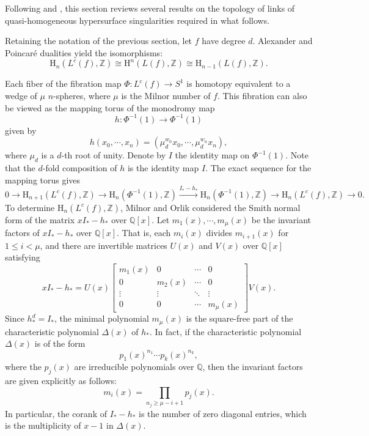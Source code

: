 \documentclass[12pt]{amsart}
\theoremstyle{definition}
\theoremstyle{remark}
\begin{document}
Following \cite{MO70} and \cite{O71}, this section reviews several results on the topology of links of quasi-homogeneous hypersurface singularities required in what follows.

Retaining the notation of the previous section, let $f$ have degree $d$.  
Alexander  and Poincar\'e dualities yield the  isomorphisms:
\[
    \mathrm{H}_n( L^c(f),\mathbb{Z})\cong \mathrm{H}^n(L(f), \mathbb{Z})\cong \mathrm{H}_{n-1}(L(f),\mathbb{Z}).
\]

Each fiber of the fibration map  $\Phi:L^c(f)\to S^1$  is homotopy equivalent to a wedge of $\mu$   $n$-spheres, where $\mu$ is the Milnor number of $f$.
This fibration can also be viewed as the mapping torus of the monodromy map $$h:\Phi^{-1}(1)\rightarrow\Phi^{-1}(1)$$ given by
\[
    h(x_0,\cdots,x_n)=(\mu_d^{w_0} x_0,\cdots,\mu_d^{w_n}x_n),
\]
where $\mu_d$ is a $d$-th root of unity. Denote by $I$ the identity map on $\Phi^{-1}(1)$. Note that the $d$-fold composition of $h$ is the identity map $I$. The exact sequence for the mapping torus gives
\[
    0\rightarrow \mathrm{H}_{n+1}( L^c(f),\mathbb{Z})\rightarrow \mathrm{H}_n(\Phi^{-1}(1),\mathbb{Z})\xrightarrow{I_\ast-h_\ast} \mathrm{H}_n(\Phi^{-1}(1),\mathbb{Z})
    \rightarrow \mathrm{H}_n(L^c(f),\mathbb{Z})\rightarrow 0.
\]
To determine $\mathrm{H}_n(L^c(f), \mathbb{Z})$, Milnor and Orlik considered the Smith normal form of the matrix $xI_\ast-h_\ast$ over $\mathbb{Q}[x]$. Let $m_1(x),\cdots,m_\mu(x)$ be the invariant factors of $xI_\ast-h_\ast$ over $\mathbb{Q}[x]$. That is, each $m_i(x)$ divides $m_{i+1}(x)$ for $1\leq i<\mu$, and there are invertible matrices $U(x)$ and $V(x)$ over $\mathbb{Q}[x]$ satisfying
\[
    xI_\ast-h_\ast=U(x)\begin{bmatrix}
        m_1(x) & 0 & \cdots & 0\\
        0 & m_2(x) & \cdots & 0 \\
        \vdots & \vdots & \ddots &\vdots \\
        0 & 0 & \cdots & m_\mu(x)
    \end{bmatrix}V(x).
\]
Since $h_\ast^d=I_\ast$, the minimal polynomial $m_\mu(x)$ is the square-free part of the characteristic polynomial $\Delta(x)$ of $h_\ast$. In fact, if the characteristic  polynomial $\Delta(x)$ is of the form $$p_1(x)^{n_1}\cdots p_k(x)^{n_k},$$ where the $p_j(x)$ are irreducible polynomials over $\mathbb{Q}$, then the invariant factors are given explicitly as follows:
\[
    m_i(x)=\prod_{n_j\geq\mu-i+1}p_j(x).
\]
In particular, the corank of $I_\ast-h_\ast$ is the number of zero diagonal entries, which is the multiplicity of $x-1$ in $\Delta(x)$.
\end{document}

